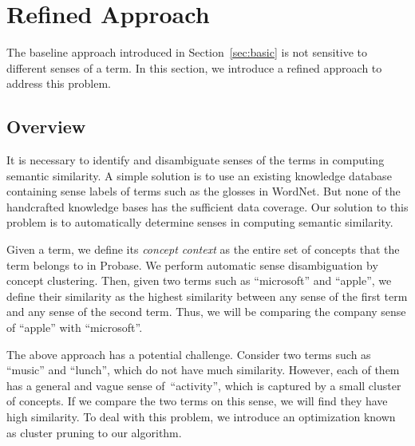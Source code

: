 \section{Refined Approach}
\label{sec:refine}
The baseline approach introduced in Section~\ref{sec:basic} is not
sensitive to different senses of a term. In this section, we introduce
a refined approach to address this problem.

\subsection{Overview}

It is necessary to identify and disambiguate senses of the terms in
computing semantic similarity. A simple solution is to use an
existing knowledge database containing sense labels of terms such as
the glosses in WordNet. But none of the handcrafted knowledge bases
has the sufficient data coverage. Our solution to this problem is to
automatically determine senses in computing semantic similarity.



Given a term, we define its {\it concept context} as the entire set of
concepts that the term belongs to in Probase.  We perform automatic
sense disambiguation by concept clustering. %
Then, given two terms such as ``microsoft'' and ``apple'', we define
their similarity as the highest similarity between any sense of the
first term and any sense of the second term. Thus, we will be
comparing the company sense of ``apple'' with ``microsoft''.

The above approach has a potential challenge. Consider two terms such
as ``music'' and ``lunch'', which do not have much
similarity. However, each of them has a general and vague sense of~``activity'', which is captured by a small cluster of concepts. If we
compare the two terms on this sense, we will find they have high
similarity. To deal with this problem, we introduce an optimization
known as cluster pruning to our algorithm. %






